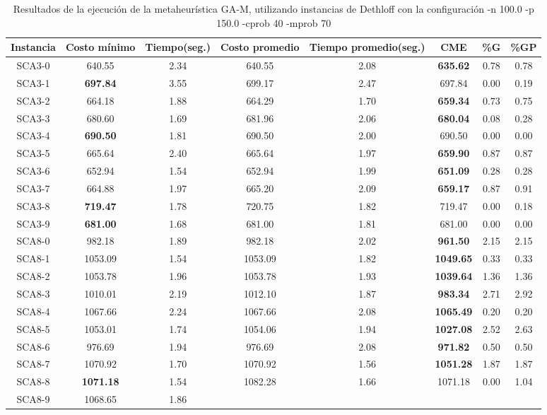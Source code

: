 \begin{table}[ht]
\caption{Resultados de la ejecución de la metaheurística GA-M, utilizando instancias de Dethloff con la configuración -n 100.0 -p 150.0 -cprob 40 -mprob 70}
\centering
\small
\begin{tabular}{c c c c c c c c}
\hline\hline
Instancia & Costo mínimo & Tiempo(seg.) & Costo promedio & Tiempo promedio(seg.) & CME & \%G & \%GP \\ [0.5ex]
\hline
SCA3-0 & 640.55 & 2.34 & 
640.55 & 2.08 & \bf{635.62} & 
0.78 & 0.78\\SCA3-1 & \bf{697.84} & 3.55 & 
699.17 & 2.47 & 697.84 & 0.00
 & 0.19\\SCA3-2 & 664.18 & 1.88 & 
664.29 & 1.70 & \bf{659.34} & 
0.73 & 0.75\\SCA3-3 & 680.60 & 1.69 & 
681.96 & 2.06 & \bf{680.04} & 
0.08 & 0.28\\SCA3-4 & \bf{690.50} & 1.81 & 
690.50 & 2.00 & 690.50 & 0.00
 & 0.00\\
SCA3-5 & 665.64 & 2.40 & 
665.64 & 1.97 & \bf{659.90} & 
0.87 & 0.87\\SCA3-6 & 652.94 & 1.54 & 
652.94 & 1.99 & \bf{651.09} & 
0.28 & 0.28\\SCA3-7 & 664.88 & 1.97 & 
665.20 & 2.09 & \bf{659.17} & 
0.87 & 0.91\\SCA3-8 & \bf{719.47} & 1.78 & 
720.75 & 1.82 & 719.47 & 0.00
 & 0.18\\SCA3-9 & \bf{681.00} & 1.68 & 
681.00 & 1.81 & 681.00 & 0.00
 & 0.00\\
SCA8-0 & 982.18 & 1.89 & 
982.18 & 2.02 & \bf{961.50} & 
2.15 & 2.15\\SCA8-1 & 1053.09 & 1.54 & 
1053.09 & 1.82 & \bf{1049.65} & 
0.33 & 0.33\\SCA8-2 & 1053.78 & 1.96 & 
1053.78 & 1.93 & \bf{1039.64} & 
1.36 & 1.36\\SCA8-3 & 1010.01 & 2.19 & 
1012.10 & 1.87 & \bf{983.34} & 
2.71 & 2.92\\SCA8-4 & 1067.66 & 2.24 & 
1067.66 & 2.08 & \bf{1065.49} & 
0.20 & 0.20\\SCA8-5 & 1053.01 & 1.74 & 
1054.06 & 1.94 & \bf{1027.08} & 
2.52 & 2.63\\SCA8-6 & 976.69 & 1.94 & 
976.69 & 2.08 & \bf{971.82} & 
0.50 & 0.50\\SCA8-7 & 1070.92 & 1.70 & 
1070.92 & 1.56 & \bf{1051.28} & 
1.87 & 1.87\\SCA8-8 & \bf{1071.18} & 1.54 & 
1082.28 & 1.66 & 1071.18 & 0.00
 & 1.04\\SCA8-9 & 1068.65 & 1.86 & 

\end{tabular}
\end{table}
